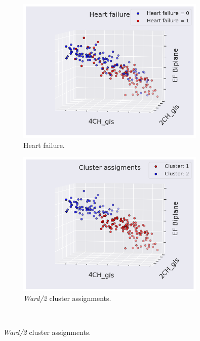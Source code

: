 \begin{figure}[htb]
    \centering
    \begin{subfigure}[b]{0.49\textwidth}
        \centering
        \includegraphics[width=0.99\textwidth]{results/hf/scatter_gls_EF_hf.png}
        \caption{Heart failure.}
        \label{fig:scatter_gls_ef_hf}
    \end{subfigure}
    \begin{subfigure}[b]{0.49\textwidth}
        \centering
        \includegraphics[width=0.99\textwidth]{results/hf/scatter_gls_EF_ward2.png}
        \caption{\textit{Ward/2} cluster assignments.}
        \label{fig:scatter_gls_ef_ward2}
    \end{subfigure}\\

\end{figure}
